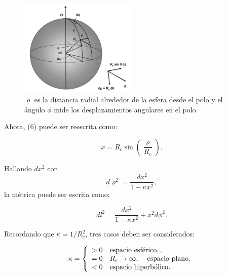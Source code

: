 \documentclass[11pt]{article}
\begin{document}
    \begin{figure}               \includegraphics[width=0.5\textwidth]{superficie_esferica_pp156_angulos.png}
        \caption{\footnotesize{$\varrho$ es la distancia radial alrededor de la esfera desde el polo y el ángulo $\phi$ mide los desplazamientos angulares en el polo.}}
    \end{figure}

Ahora, (6) puede ser reescrita como: 

    \begin{equation}
        x = R_c \sin \left(\frac{\varrho}{R_c} \right).
    \end{equation}
    
    Hallando $dx^2$ con $$d\varrho^2 = \frac{dx^2}{1-\kappa x^2},$$
    la métrica puede ser escrita como: 
    
    \begin{equation}
        dl^2 = \frac{dx^2}{1-\kappa x^2} + x^2d\phi^2.
    \end{equation}
    
    \vspace{0.6cm}
    Recordando que $\kappa = 1/R_c^2$, tres casos deben ser considerados: 
    
    \begin{equation*}
     \label{eq:aqui-le-mostramos-como-hacerle-la-llave-grande}
     \kappa  = \left\{
	       \begin{array}{ll}
		 > 0      & {\text{espacio esférico}},, \\
		 = 0 & R_c \rightarrow{\infty}, \hspace{0.4cm}  {\text{espacio plano}}, \\
		 < 0     & {\text{espacio hiperbólico}}.
	       \end{array}
	     \right.
   \end{equation*}
    
    \vspace{0.4cm}
    
\end{document}
